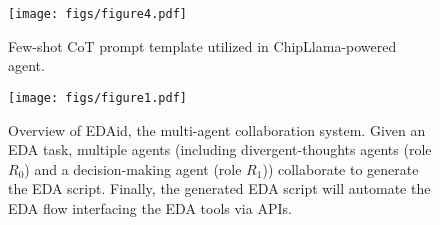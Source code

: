 \begin{figure}[tb!]
    \centering
    \texttt{[image: figs/figure4.pdf]} 
    \caption{Few-shot CoT prompt template utilized in ChipLlama-powered agent.}
    \label{fig:cot_prompt}
\end{figure}

\begin{figure*}[tb!]
    \centering
    \texttt{[image: figs/figure1.pdf]} 
    \caption{Overview of EDAid, the multi-agent collaboration system. Given an EDA task, multiple agents (including divergent-thoughts agents (role $R_{0}$) and a decision-making agent (role $R_{1}$)) collaborate to generate the EDA script. Finally, the generated EDA script will automate the EDA flow interfacing the EDA tools via APIs.}
    \label{fig:multi_agent_cosys}
\end{figure*}

